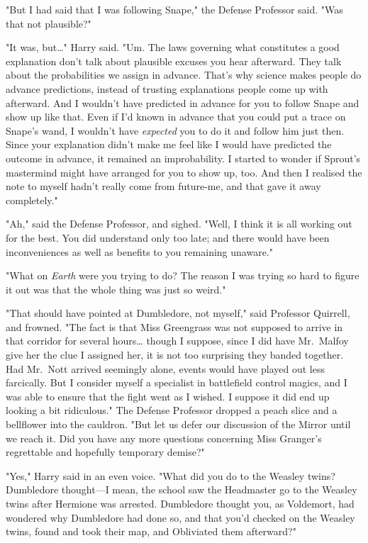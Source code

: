 "But I had said that I was following Snape," the Defense Professor said. "Was
that not plausible?"

"It was, but{\ldots}" Harry said. "Um. The laws governing what constitutes a
good explanation don't talk about plausible excuses you hear afterward. They
talk about the probabilities we assign in advance. That's why science makes
people do advance predictions, instead of trusting explanations people come up
with afterward. And I wouldn't have predicted in advance for you to follow
Snape and show up like that. Even if I'd known in advance that you could put a
trace on Snape's wand, I wouldn't have \emph{expected} you to do it and follow
him just then. Since your explanation didn't make me feel like I would have
predicted the outcome in advance, it remained an improbability. I started to
wonder if Sprout's mastermind might have arranged for you to show up, too. And
then I realised the note to myself hadn't really come from future-me, and that
gave it away completely."

"Ah," said the Defense Professor, and sighed. "Well, I think it is all working
out for the best. You did understand only too late; and there would have been
inconveniences as well as benefits to you remaining unaware."

"What on \emph{Earth} were you trying to do? The reason I was trying so hard to
figure it out was that the whole thing was just so weird."

"That should have pointed at Dumbledore, not myself," said Professor Quirrell,
and frowned. "The fact is that Miss Greengrass was not supposed to arrive in
that corridor for several hours{\ldots} though I suppose, since I did have
Mr.~Malfoy give her the clue I assigned her, it is not too surprising they
banded together. Had Mr.~Nott arrived seemingly alone, events would have played
out less farcically. But I consider myself a specialist in battlefield control
magics, and I was able to ensure that the fight went as I wished. I suppose it
did end up looking a bit ridiculous." The Defense Professor dropped a peach
slice and a bellflower into the cauldron. "But let us defer our discussion of
the Mirror until we reach it. Did you have any more questions concerning Miss
Granger's regrettable and hopefully temporary demise?"

"Yes," Harry said in an even voice. "What did you do to the Weasley twins?
Dumbledore thought---I mean, the school saw the Headmaster go to the Weasley
twins after Hermione was arrested. Dumbledore thought you, as Voldemort, had
wondered why Dumbledore had done so, and that you'd checked on the Weasley
twins, found and took their map, and Obliviated them afterward?"

